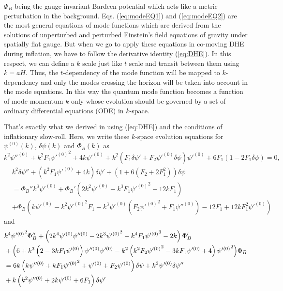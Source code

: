 \documentclass[a4paper,11pt]{article}
\begin{document}
$\Phi_B$ being the gauge invariant Bardeen potential \cite{Baumann:2009ds} which acts like a metric perturbation in the background. Eqs. (\ref{eq:modeEQ1}) and (\ref{eq:modeEQ2}) are the most general equations of mode functions which are derived from the solutions of unperturbed and perturbed Einstein's field equations \cite{Baumann:2009ds} of gravity under spatially flat gauge. But when we go to apply these equations in co-moving DHE during inflation, we have to follow the derivative identity (\ref{eq:DHE}). In this respect, we can define a $k$ scale just like $t$ scale and transit between them using $k=aH$. Thus, the $t$-dependency of the mode function will be mapped to $k$-dependency and only the modes crossing the horizon will be taken into account in the mode equations. In this way the quantum mode function becomes a function of mode momentum $k$ only whose evolution should be governed by a set of ordinary differential equations (ODE) in $k$-space.\par That's exactly what we derived in \cite{Sarkar:2021ird} using (\ref{eq:DHE}) and the conditions of inflationary slow-roll. Here, we write these $k$-space evolution equations for $\psi^{(0)}(k)$, $\delta\psi(k)$ and $\Phi_B (k)$ as
\begin{equation}
    k^2\psi''^{(0)}+k^2F_1{\psi'^{(0)}}^2+4k\psi'^{(0)}+k^2\left(F_1\delta\psi'+F_2\psi'^{(0)}\delta\psi\right)\psi'^{(0)}+6F_1\left(1-2F_1\delta\psi\right)=0,
    \label{eq:modeKeqfinal1}
\end{equation}
\begin{equation}
    \begin{split}
        &k^2\delta\psi''+\left(k^2F_1\psi'^{(0)}+4k\right)\delta\psi'+\left(1+6\left(F_2+2F_1^2\right)\right)\delta\psi\\
        &=\Phi_B''k^3\psi'^{(0)}+\Phi_B'\left(2k^2\psi'^{(0)}-k^3F_1{\psi'^{(0)}}^2-12kF_1\right)\\
        &+\Phi_B\left(k\psi'^{(0)}-k^2{\psi'^{(0)}}^2F_1-k^3\psi'^{(0)}\left(F_2{\psi'^{(0)}}^2+F_1\psi''^{(0)}\right)-12F_1+12kF_1^2\psi'^{(0)}\right)
    \end{split}
     \label{eq:modeKeqfinal2}
\end{equation}
and
\begin{equation}
    \begin{split}
        &k^4{\psi'^{(0)}}^2\Phi_B''+\left(2k^4\psi'^{(0)}\psi''^{(0)}-2k^3{\psi'^{(0)}}^2-k^4F_1{\psi'^{(0)}}^3-2k\right)\Phi_B'\\
        &+\Bigl(6+k^3\left(2-3kF_1\psi'^{(0)}\right)\psi''^{(0)}\psi'^{(0)}
        -k^2\left(k^2F_2{\psi'^{(0)}}^2-3kF_1\psi'^{(0)}+4\right){\psi'^{(0)}}^2\Bigr)\Phi_B\\
        &=6k\left(k\psi''^{(0)}+kF_1{\psi'^{(0)}}^2+\psi'^{(0)}+F_2\psi'^{(0)}\right)\delta\psi+k^3\psi'^{(0)}\delta\psi''\\
        &+k\left(k^2\psi''^{(0)}+2k\psi'^{(0)}+6F_1\right)\delta\psi'
    \end{split}
      \label{eq:modeKeqfinal3}
\end{equation}
\end{document}

